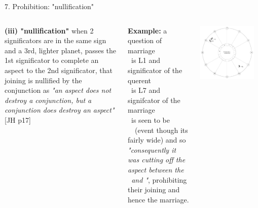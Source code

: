 \begin{frame}[t]{7. Prohibition: "nullification"}
\begin{columns}[T, onlytextwidth]
\vspace{0.5cm}
\textbf{(iii) "nullification"} when 2 significators are in the same sign and a 3rd, lighter planet, passes the 1st significator to complete an aspect to the 2nd significator, that joining is nullified by the conjunction as \textsl{"an aspect does not destroy a conjunction, but a conjunction does destroy an aspect"} [JH p17]

\vspace{0.25cm}
\textbf{Example:} a question of marriage \\
\ul
\Moon\ is L1 and significator of the querent \\
\Saturn\ is L7 and signifcator of the marriage \\
\Mars\ is seen to be \Conjunction\ \Saturn\ (event though its fairly wide) and so \textsl{"consequently it was cutting off the aspect between the \Moon\ and \Saturn"}, prohibiting their joining and hence the marriage.

\begin{center}
{\includegraphics[width=0.9\textwidth]{charts/64-nullification}} \\
\end{center}
\end{columns}
\end{frame}
